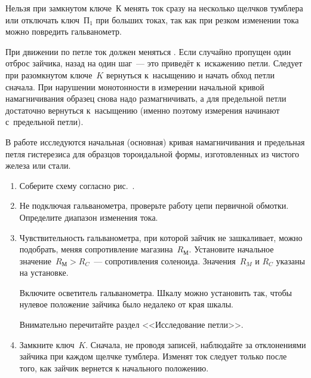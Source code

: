 Нельзя при замкнутом ключе~К менять ток сразу на несколько щелчков тумблера или
отключать ключ~$\text{П}_1$ при больших токах, так как при резком изменении
тока можно повредить гальванометр.

При движении по петле ток должен меняться .
Если случайно пропущен один отброс зайчика, 
назад на один шаг~--- это приведёт к~искажению петли. Следует при разомкнутом
ключе~$K$ вернуться к~насыщению и начать
обход петли сначала. При нарушении монотонности в измерении начальной кривой
намагничивания образец снова надо размагничивать, а для предельной петли
достаточно вернуться к~насыщению (именно поэтому измерения начинают с~предельной
петли).

\begin{lab:task}


	В работе исследуются начальная (основная) кривая намагничивания и предельная
петля гистерезиса для образцов тороидальной
	формы, изготовленных из чистого железа или стали.

	\begin{enumerate}


	\item Соберите схему согласно рис.~.

	\item Не подключая гальванометра, проверьте работу цепи первичной обмотки.
Определите диапазон изменения тока.

	\item Чувствительность гальванометра, при которой зайчик не зашкаливает,
можно подобрать, меняя сопротивление
	магазина~$R_М$. Установите начальное значение~$R_М>R_C$~--- сопротивления
соленоида. Значения~$R_M$ и $R_C$ указаны на
	установке.

	Включите осветитель гальванометра. Шкалу можно установить так, чтобы нулевое
положение зайчика было недалеко от края
	шкалы.

	\begin{lab:warning}
		Внимательно перечитайте раздел <<Исследование петли>>.
	\end{lab:warning}

	\item Замкните ключ~$K$. Сначала, не проводя записей, наблюдайте за
отклонениями зайчика при каждом щелчке тумблера. Изменят ток следует только
после того, как зайчик вернется к начального положению.


\end{enumerate}
\end{lab:task}
